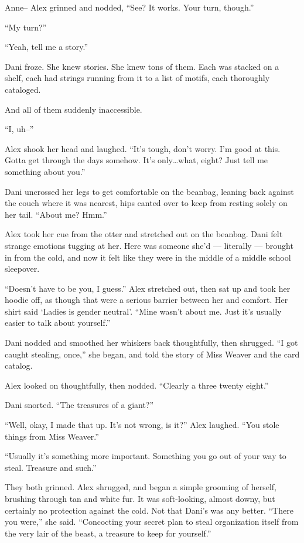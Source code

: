Anne-- Alex grinned and nodded, ``See? It works. Your turn, though.''

``My turn?''

``Yeah, tell me a story.''

Dani froze. She knew stories. She knew tons of them. Each was stacked on a shelf, each had strings running from it to a list of motifs, each thoroughly cataloged.

And all of them suddenly inaccessible.

``I, uh--''

Alex shook her head and laughed. ``It's tough, don't worry. I'm good at this. Gotta get through the days somehow. It's only\ldots{}what, eight? Just tell me something about you.''

Dani uncrossed her legs to get comfortable on the beanbag, leaning back against the couch where it was nearest, hips canted over to keep from resting solely on her tail. ``About me? Hmm.''

Alex took her cue from the otter and stretched out on the beanbag. Dani felt strange emotions tugging at her. Here was someone she'd --- literally --- brought in from the cold, and now it felt like they were in the middle of a middle school sleepover.

``Doesn't have to be you, I guess.'' Alex stretched out, then sat up and took her hoodie off, as though that were a serious barrier between her and comfort. Her shirt said `Ladies is gender neutral'. ``Mine wasn't about me. Just it's usually easier to talk about yourself.''

Dani nodded and smoothed her whiskers back thoughtfully, then shrugged. ``I got caught stealing, once,'' she began, and told the story of Miss Weaver and the card catalog.

Alex looked on thoughtfully, then nodded. ``Clearly a three twenty eight.''

Dani snorted. ``The treasures of a giant?''

``Well, okay, I made that up. It's not wrong, is it?'' Alex laughed. ``You stole things from Miss Weaver.''

``Usually it's something more important. Something you go out of your way to steal. Treasure and such.''

They both grinned. Alex shrugged, and began a simple grooming of herself, brushing through tan and white fur. It was soft-looking, almost downy, but certainly no protection against the cold. Not that Dani's was any better. ``There you were,'' she said. ``Concocting your secret plan to steal organization itself from the very lair of the beast, a treasure to keep for yourself.''

